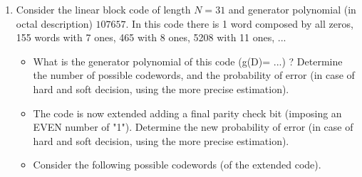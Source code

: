 \documentclass[11pt]{article}
\begin{document}
\begin{enumerate}
\item 

Consider the linear block code of length $N = 31$ and generator polynomial (in octal description)
$107657$. In this code there is 1 word composed by all zeros, 155 words with 7 ones, 465 with 8 ones, 5208 with 11 ones, ...

\begin{itemize} 
\item 
What is the generator polynomial of this code (g(D)= ...) ? Determine the number of possible codewords, and the probability of error (in case of hard and soft decision, using the more precise estimation).

\item The code is now extended adding a final parity check bit (imposing an EVEN number of "1").
Determine the new probability of error (in case of hard and soft decision, using the more precise estimation).

\item Consider the following possible codewords (of the extended code).
\end{itemize}





\end{enumerate}
\end{document}
